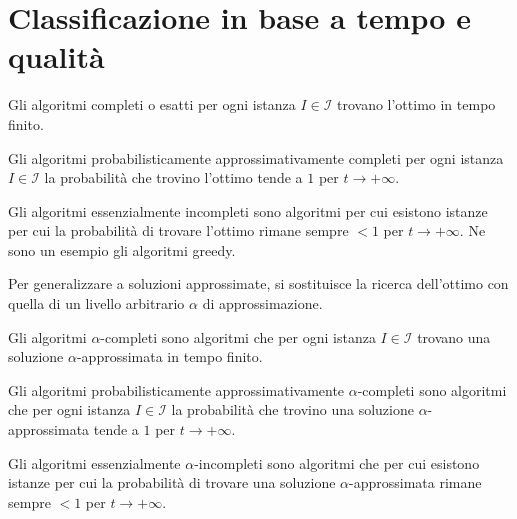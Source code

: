 \documentclass[\main/main.tex]{subfiles}
\begin{document}
\section{Classificazione in base a tempo e qualità}
\begin{multicols}{2}
    \begin{definition}
        Gli algoritmi completi o esatti per ogni istanza \(I \in \mathcal{I}\) trovano l'ottimo in tempo finito.
    \end{definition}
    \begin{definition}
        Gli algoritmi probabilisticamente approssimativamente completi per ogni istanza \(I \in \mathcal{I}\) la probabilità che trovino l'ottimo tende a \(1\) per \(t \rightarrow + \infty\).
    \end{definition}
    \begin{definition}
        Gli algoritmi essenzialmente incompleti sono algoritmi per cui esistono istanze per cui la probabilità di trovare l'ottimo rimane sempre \(<1\) per \(t\rightarrow + \infty\). Ne sono un esempio gli algoritmi greedy.
    \end{definition}
    \begin{observation}
        Per generalizzare a soluzioni approssimate, si sostituisce la ricerca dell'ottimo con quella di un livello arbitrario \(\alpha\) di approssimazione.
    \end{observation}
    \begin{definition}
        Gli algoritmi \(\alpha\)-completi sono algoritmi che per ogni istanza \(I \in \mathcal{I}\) trovano una soluzione \(\alpha\)-approssimata in tempo finito.
    \end{definition}
    \begin{definition}
        Gli algoritmi probabilisticamente approssimativamente \(\alpha\)-completi sono algoritmi che per ogni istanza \(I \in \mathcal{I}\) la probabilità che trovino una soluzione \(\alpha\)-approssimata tende a \(1\) per \(t \rightarrow + \infty\).
    \end{definition}
    \begin{definition}
        Gli algoritmi essenzialmente \(\alpha\)-incompleti sono algoritmi che per cui esistono istanze per cui la probabilità di trovare una soluzione \(\alpha\)-approssimata rimane sempre \(<1\) per \(t\rightarrow + \infty\). 
    \end{definition}
\end{multicols}
\clearpage
\end{document}
